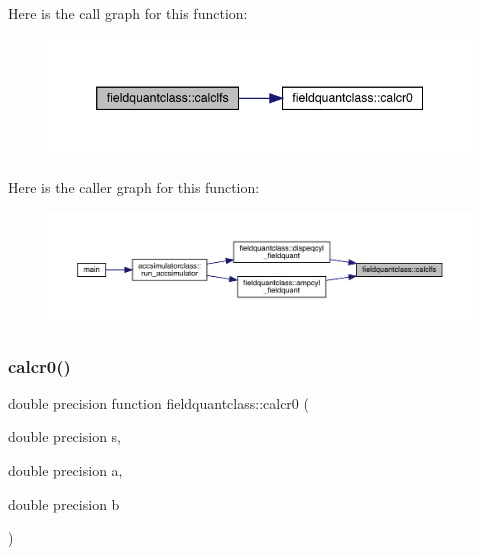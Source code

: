 Here is the call graph for this function\+:\nopagebreak
\begin{figure}[H]
\begin{center}
\leavevmode
\includegraphics[width=346pt]{namespacefieldquantclass_a491cfca134ed1bb2dfc47d6de7fdd972_cgraph}
\end{center}
\end{figure}
Here is the caller graph for this function\+:\nopagebreak
\begin{figure}[H]
\begin{center}
\leavevmode
\includegraphics[width=350pt]{namespacefieldquantclass_a491cfca134ed1bb2dfc47d6de7fdd972_icgraph}
\end{center}
\end{figure}
\mbox{\label{namespacefieldquantclass_a765f0fc87c405fa965c6c966794db11c}} 
\subsubsection{\texorpdfstring{calcr0()}{calcr0()}}
{\footnotesize\ttfamily double precision function fieldquantclass\+::calcr0 (\begin{DoxyParamCaption}\item[{double precision}]{s,  }\item[{double precision}]{a,  }\item[{double precision}]{b }\end{DoxyParamCaption})}

